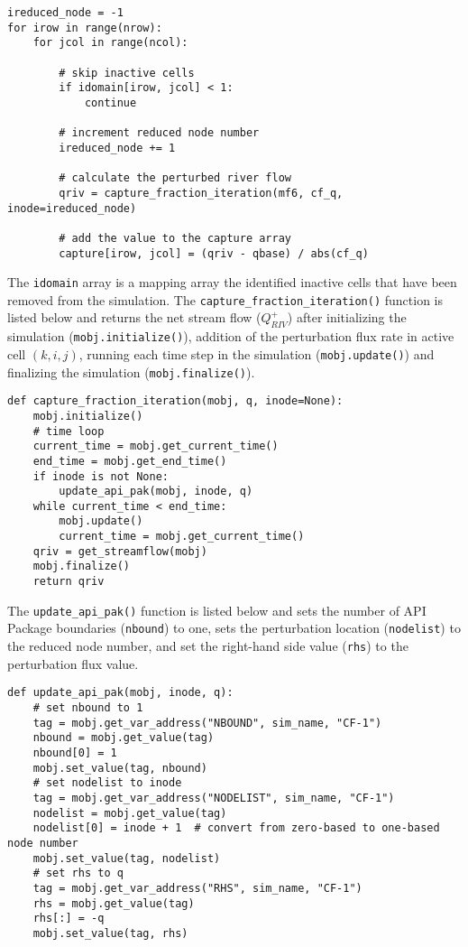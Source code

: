\begin{lstlisting}
ireduced_node = -1
for irow in range(nrow):
    for jcol in range(ncol):

        # skip inactive cells
        if idomain[irow, jcol] < 1:
            continue

        # increment reduced node number
        ireduced_node += 1

        # calculate the perturbed river flow
        qriv = capture_fraction_iteration(mf6, cf_q, inode=ireduced_node)

        # add the value to the capture array
        capture[irow, jcol] = (qriv - qbase) / abs(cf_q)
\end{lstlisting}

\noindent The \texttt{idomain} array is a mapping array the identified inactive cells that have been removed from the simulation. The \texttt{capture\_fraction\_iteration()} function is listed below and returns the net stream flow ($Q_{RIV}^{+}$) after initializing the simulation (\texttt{mobj.initialize()}), addition of the perturbation flux rate in active cell $(k, i, j)$, running each time step in the simulation (\texttt{mobj.update()}) and finalizing the simulation (\texttt{mobj.finalize()}).

\begin{lstlisting}
def capture_fraction_iteration(mobj, q, inode=None):
    mobj.initialize()
    # time loop
    current_time = mobj.get_current_time()
    end_time = mobj.get_end_time()
    if inode is not None:
        update_api_pak(mobj, inode, q)
    while current_time < end_time:
        mobj.update()
        current_time = mobj.get_current_time()
    qriv = get_streamflow(mobj)
    mobj.finalize()
    return qriv
\end{lstlisting}

\noindent The \texttt{update\_api\_pak()} function is listed below and sets the number of API Package boundaries (\texttt{nbound}) to one, sets the perturbation location (\texttt{nodelist}) to the reduced node number, and set the right-hand side value (\texttt{rhs}) to the perturbation flux value.

\begin{lstlisting}
def update_api_pak(mobj, inode, q):
    # set nbound to 1
    tag = mobj.get_var_address("NBOUND", sim_name, "CF-1")
    nbound = mobj.get_value(tag)
    nbound[0] = 1
    mobj.set_value(tag, nbound)
    # set nodelist to inode
    tag = mobj.get_var_address("NODELIST", sim_name, "CF-1")
    nodelist = mobj.get_value(tag)
    nodelist[0] = inode + 1  # convert from zero-based to one-based node number
    mobj.set_value(tag, nodelist)
    # set rhs to q
    tag = mobj.get_var_address("RHS", sim_name, "CF-1")
    rhs = mobj.get_value(tag)
    rhs[:] = -q
    mobj.set_value(tag, rhs)
\end{lstlisting}

